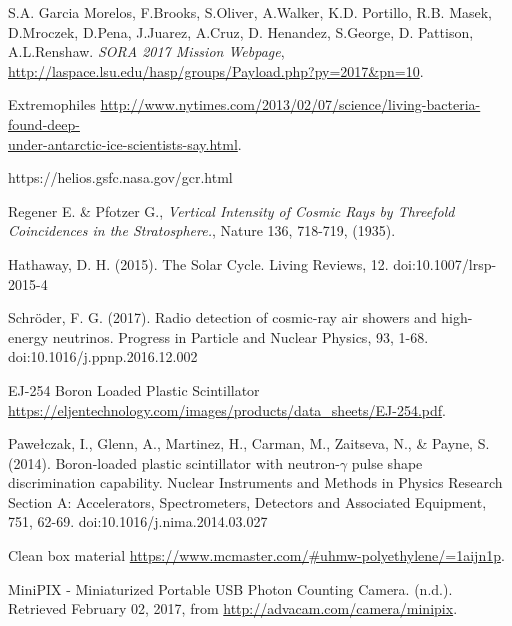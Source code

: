 \newpage

\begin{thebibliography}{9}
S.A. Garcia Morelos, F.Brooks, S.Oliver, A.Walker, K.D. Portillo, R.B. Masek, D.Mroczek, D.Pena, J.Juarez, A.Cruz, D. Henandez, S.George, D. Pattison, A.L.Renshaw. \textit{SORA 2017 Mission Webpage}, \url{http://laspace.lsu.edu/hasp/groups/Payload.php?py=2017&pn=10}.

  Extremophiles \href{http://www.nytimes.com/2013/02/07/science/living-bacteria-found-deep-under-antarctic-ice-scientists-say.html}{http://www.nytimes.com/2013/02/07/science/living-bacteria-found-deep-\\under-antarctic-ice-scientists-say.html}.

  https://helios.gsfc.nasa.gov/gcr.html

  Regener E. \& Pfotzer G., \textit{Vertical Intensity of Cosmic Rays by Threefold Coincidences in the Stratosphere.}, Nature 136, 718-719, (1935). 


  Hathaway, D. H. (2015). The Solar Cycle. Living Reviews, 12. doi:10.1007/lrsp-2015-4
  
  Schröder, F. G. (2017). Radio detection of cosmic-ray air showers and high-energy neutrinos. Progress in Particle and Nuclear Physics, 93, 1-68. doi:10.1016/j.ppnp.2016.12.002
    
  EJ-254 Boron Loaded Plastic Scintillator \url{https://eljentechnology.com/images/products/data_sheets/EJ-254.pdf}.

  Pawełczak, I., Glenn, A., Martinez, H., Carman, M., Zaitseva, N., \& Payne, S. (2014). Boron-loaded plastic scintillator with neutron-$\gamma$ pulse shape discrimination capability. Nuclear Instruments and Methods in Physics Research Section A: Accelerators, Spectrometers, Detectors and Associated Equipment, 751, 62-69. doi:10.1016/j.nima.2014.03.027

  Clean box material \url{https://www.mcmaster.com/\#uhmw-polyethylene/=1aijn1p}.

  MiniPIX - Miniaturized Portable USB Photon Counting Camera. (n.d.). Retrieved February 02, 2017, from \url{http://advacam.com/camera/minipix}.


\end{thebibliography}
